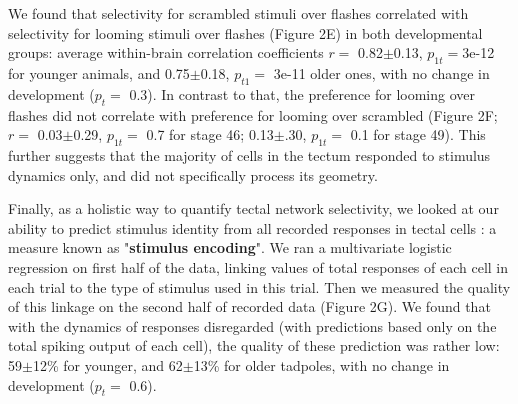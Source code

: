 \documentclass{article}
\begin{document}
We found that selectivity for scrambled stimuli over flashes correlated with selectivity for looming stimuli over flashes (Figure 2E) in both developmental groups: average within-brain correlation coefficients $r=$ 0.82$\pm$0.13, $p_{1t}=$3e-12 for younger animals, and 0.75$\pm$0.18, $p_{t1}=$ 3e-11 older ones, with no change in development ($p_t=$ 0.3). In contrast to that, the preference for looming over flashes did not correlate with preference for looming over scrambled (Figure 2F; $r=$ 0.03$\pm$0.29, $p_{1t}=$ 0.7 for stage 46; 0.13$\pm$.30, $p_{1t}=$ 0.1 for stage 49). This further suggests that the majority of cells in the tectum responded to stimulus dynamics only, and did not specifically process its geometry.

Finally, as a holistic way to quantify tectal network selectivity, we looked at our ability to predict stimulus identity from all recorded responses in tectal cells \citep{avitan2016limitations}: a measure known as "\textbf{stimulus encoding}". We ran a multivariate logistic regression on first half of the data, linking values of total responses of each cell in each trial to the type of stimulus used in this trial. Then we measured the quality of this linkage on the second half of recorded data (Figure 2G). We found that with the dynamics of responses disregarded (with predictions based only on the total spiking output of each cell), the quality of these prediction was rather low: 59$\pm$12\% for younger, and 62$\pm$13\% for older tadpoles, with no change in development ($p_t=$ 0.6).
\end{document}
